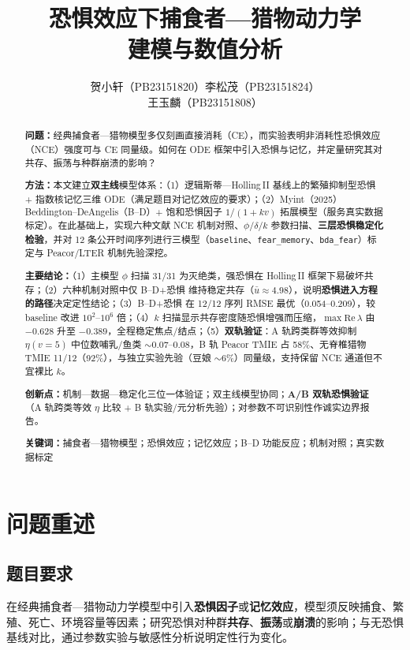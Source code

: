 \documentclass[12pt,a4paper]{ctexart}
\title{\textbf{恐惧效应下捕食者—猎物动力学\\建模与数值分析}}
\author{%
  贺小轩（PB23151820）\quad 李松茂（PB23151824）\\[0.25em]
  王玉麟（PB23151808）%
}
\date{}
\newcommand{\modeltrio}{三模型（\texttt{baseline}、\texttt{fear\_memory}、\texttt{bda\_fear}）}
\begin{document}
\maketitle

\begin{abstract}
\textbf{问题：}经典捕食者—猎物模型多仅刻画直接消耗（CE），而实验表明非消耗性恐惧效应（NCE）强度可与 CE 同量级。如何在 ODE 框架中引入恐惧与记忆，并定量研究其对共存、振荡与种群崩溃的影响？

\textbf{方法：}本文建立\textbf{双主线}模型体系：（1）逻辑斯蒂—Holling\,II 基线上的繁殖抑制型恐惧 + 指数核记忆三维 ODE（满足题目对记忆效应的要求）；（2）Myint（2025）Beddington--DeAngelis（B--D）+ 饱和恐惧因子 $1/(1+kv)$ 拓展模型（服务真实数据标定）。在此基础上，实现六种文献 NCE 机制对照、$\phi/\delta/k$ 参数扫描、\textbf{三层恐惧稳定化检验}，并对 12 条公开时间序列进行\modeltrio{}标定与 Peacor/LTER 机制先验深挖。

\textbf{主要结论：}（1）主模型 $\phi$ 扫描 31/31 为灭绝类，强恐惧在 Holling\,II 框架下易破坏共存；（2）六种机制对照中仅 B--D+恐惧 维持稳定共存（$\bar{u}\approx 4.98$），说明\textbf{恐惧进入方程的路径}决定定性结论；（3）B--D+恐惧 在 12/12 序列 RMSE 最优（0.054--0.209），较 baseline 改进 $10^2$--$10^6$ 倍；（4）$k$ 扫描显示共存密度随恐惧增强而压缩，$\max\mathrm{Re}\,\lambda$ 由 $-0.628$ 升至 $-0.389$，全程稳定焦点/结点；（5）\textbf{双轨验证}：A 轨跨类群等效抑制 $\eta(v=5)$ 中位数哺乳/鱼类 $\sim$0.07--0.08，B 轨 Peacor TMIE 占 58\%、无脊椎猎物 TMIE 11/12（92\%），与独立实验先验（豆娘 $\sim$6\%）同量级，支持保留 NCE 通道但不宜裸比 $k$。

\textbf{创新点：}机制—数据—稳定化三位一体验证；双主线模型协同；\textbf{A/B 双轨恐惧验证}（A 轨跨类等效 $\eta$ 比较 + B 轨实验/元分析先验）；对参数不可识别性作诚实边界报告。

\textbf{关键词：}捕食者—猎物模型；恐惧效应；记忆效应；B--D 功能反应；机制对照；真实数据标定
\end{abstract}

\tableofcontents
\newpage

\section{问题重述}

\subsection{题目要求}

在经典捕食者—猎物动力学模型中引入\textbf{恐惧因子}或\textbf{记忆效应}，模型须反映捕食、繁殖、死亡、环境容量等因素；研究恐惧对种群\textbf{共存}、\textbf{振荡}或\textbf{崩溃}的影响；与无恐惧基线对比，通过参数实验与敏感性分析说明定性行为变化。
\end{document}
